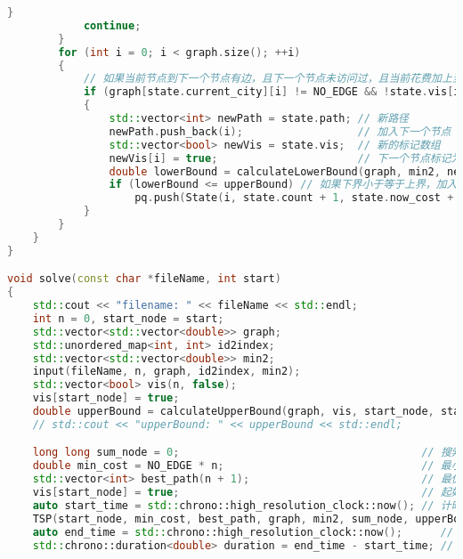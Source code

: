 \documentclass[lang=cn,11pt,a4paper]{elegantpaper}
\begin{document}
\begin{lstlisting}[language=c++]
            }
            continue;
        }
        for (int i = 0; i < graph.size(); ++i)
        {
            // 如果当前节点到下一个节点有边，且下一个节点未访问过，且当前花费加上当前节点到下一个节点的花费小于最小花费
            if (graph[state.current_city][i] != NO_EDGE && !state.vis[i] && graph[state.current_city][i] + state.now_cost < min_cost)
            {
                std::vector<int> newPath = state.path; // 新路径
                newPath.push_back(i);                  // 加入下一个节点
                std::vector<bool> newVis = state.vis;  // 新的标记数组
                newVis[i] = true;                      // 下一个节点标记为已访问
                double lowerBound = calculateLowerBound(graph, min2, newPath, newVis);
                if (lowerBound <= upperBound) // 如果下界小于等于上界，加入优先队列
                    pq.push(State(i, state.count + 1, state.now_cost + graph[state.current_city][i], lowerBound, newPath, newVis));
            }
        }
    }
}

void solve(const char *fileName, int start)
{
    std::cout << "filename: " << fileName << std::endl;                             // 输出文件名
    int n = 0, start_node = start;                                                  // 节点数，起始节点
    std::vector<std::vector<double>> graph;                                         // 邻接矩阵
    std::unordered_map<int, int> id2index;                                          // id到下标的映射
    std::vector<std::vector<double>> min2;                                          // 存储每个节点最短的2条路径的长度
    input(fileName, n, graph, id2index, min2);                                      // 读取输入文件
    std::vector<bool> vis(n, false);                                                // 标记节点是否被访问过
    vis[start_node] = true;                                                         // 起始节点标记为已访问
    double upperBound = calculateUpperBound(graph, vis, start_node, start_node, 1); // 计算上界
    // std::cout << "upperBound: " << upperBound << std::endl;                         // 输出上界

    long long sum_node = 0;                                      // 搜索节点数，初始化为0，longlong防止溢出
    double min_cost = NO_EDGE * n;                               // 最小花费
    std::vector<int> best_path(n + 1);                           // 最优路径，图总共n个点，回到起点又是一个点，所以是n+1个点
    vis[start_node] = true;                                      // 起始节点标记为已访问
    auto start_time = std::chrono::high_resolution_clock::now(); // 计时开始
    TSP(start_node, min_cost, best_path, graph, min2, sum_node, upperBound);
    auto end_time = std::chrono::high_resolution_clock::now();      // 计时结束
    std::chrono::duration<double> duration = end_time - start_time; // 计算耗时


\end{lstlisting}
\end{document}
